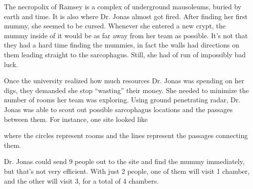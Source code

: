 The necropolix of Ramsey is a complex of underground mausoleums, buried by earth and time.
It is also where Dr. Jonas almost got fired.
After finding her first mummy, she seemed to be cursed.
Whenever she entered a new crypt, the mummy inside of it would be as far away from her team as possible.
It's not that they had a hard time finding the mummies, in fact the walls had directions on them leading straight to the sarcophagus.
Still, she had of run of impossibly bad luck.

Once the university realized how much resources Dr. Jonas was spending on her digs, they demanded she stop ``wasting'' their money.
She needed to minimize the number of rooms her team was exploring.
Using ground penetrating radar, Dr. Jonas was able to scout out possible sarcophagus locations and the passages between them.
For instance, one site looked like

\begin{center}
  \end{center}
  
where the circles represent rooms and the lines represent the passages connecting them.

Dr. Jonas could send 9 people out to the site and find the mummy immediately, but that's not very efficient.
With just 2 people, one of them will visit 1 chamber, and the other will visit 3, for a total of 4 chambers.

